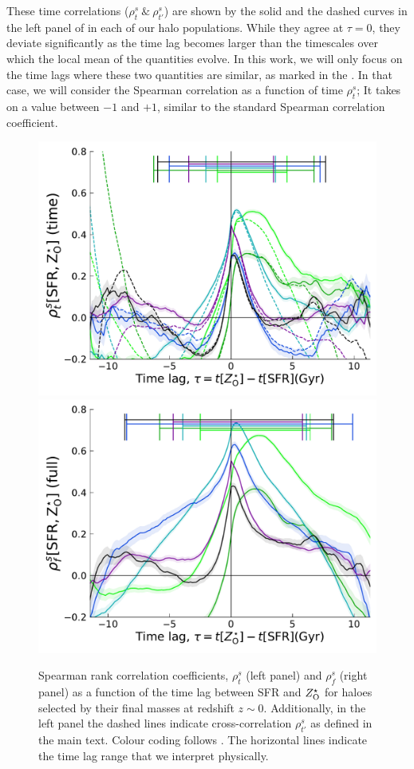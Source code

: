 These time correlations ($\rho^s_t ~\&~ \rho^s_{t'}$) are shown by the solid and the dashed curves in the left panel of  in each of our halo populations. While they agree at $\tau=0$, they deviate significantly as the time lag becomes larger than the timescales over which the local mean of the quantities evolve. In this work, we will only focus on the time lags where these two quantities are similar, as marked in the . In that case, we will consider the Spearman correlation as a function of time $\rho^s_t$; It takes on a value between $-1$ and $+1$, similar to the standard Spearman correlation coefficient. 
\begin{figure}[htbp]
\centering
\includegraphics[width=.49\linewidth]{plots/dynam_relxn/Spea_correl_vs_shift_betw_SFR-Z(O)_SFreg_timecorr.pdf}
\includegraphics[width=.49\linewidth]{plots/dynam_relxn/Spea_correl_vs_shift_betw_SFR-Z(O)_SFreg_fullcorr.pdf}
\caption{Spearman rank correlation coefficients, $\rho^s_t$ (left panel) and $\rho^s_f$ (right panel) as a function of the time lag between SFR and $Z^{\star}_{\rm{O}}$ for haloes selected by their final masses at redshift $z\sim 0$. Additionally, in the left panel the dashed lines indicate cross-correlation $\rho^s_{t'}$ as defined in the main text. Colour coding follows . The horizontal lines indicate the time lag range that we interpret physically.}
\label{fig:dynam-correl-sfr-ZOsfr-timeshift-func-all}
\end{figure}
